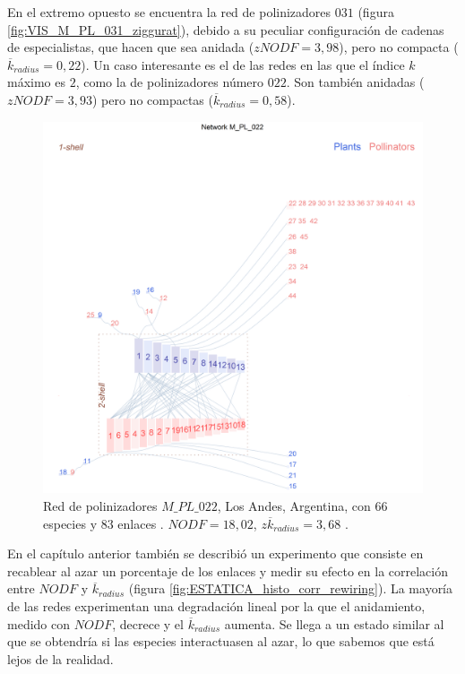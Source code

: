 En el extremo opuesto se encuentra la red de polinizadores $031$ (figura \ref{fig:VIS_M_PL_031_ziggurat}), debido a su peculiar configuración de cadenas de especialistas, que hacen que sea anidada ($zNODF = 3,98$), pero no compacta ($\overline {k}_{radius} = 0,22$). Un caso interesante es el de las redes en las que el índice $k$ máximo es $2$, como la de polinizadores número $022$. Son también anidadas ($zNODF = 3,93$) pero no compactas ($\overline {k}_{radius} = 0,58$).

\begin{figure}[h!]
\centering
\includegraphics[scale=0.5]{Figures/VIS_M_PL_022_ziggurat.png}
\caption {Red de polinizadores $M\_PL\_022$, Los Andes, Argentina, con $66$ especies y $83$ enlaces \cite{medan2002plant}. $NODF = 18,02$, $z \overline {k}_{radius} = 3,68$ .}
\label{fig:VIS_M_PL_022_ziggurat}
\end{figure}

\clearpage
En el capítulo anterior también se describió un experimento que consiste en recablear al azar un porcentaje de los enlaces y medir su efecto en la correlación entre $NODF$ y $\overline k_{radius}$ (figura \ref{fig:ESTATICA_histo_corr_rewiring}). La mayoría de las redes experimentan una degradación lineal por la que el anidamiento, medido con $NODF$, decrece y el $\overline k_{radius}$ aumenta. Se llega a un estado similar al que se obtendría si las especies interactuasen al azar, lo que sabemos que está lejos de la realidad.

